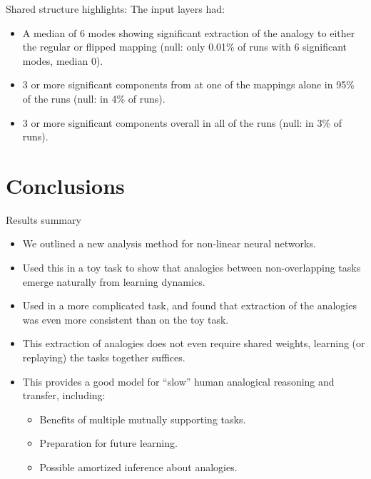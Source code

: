 \documentclass{beamer}
\begin{document}
\begin{frame}{Shared structure highlights:}
The input layers had:
\begin{itemize}
    \item<1-> A median of 6 modes showing significant extraction of the analogy to either the regular or flipped mapping (null: only 0.01\% of runs with 6 significant modes, median 0).
    \item<2-> 3 or more significant components from at one of the mappings alone in 95\% of the runs (null: in 4\% of runs).
    \item<3-> 3 or more significant components overall in all of the runs (null: in 3\% of runs).
\end{itemize}
\end{frame}
\section{Conclusions}

\begin{frame}{Results summary}
\begin{itemize}
    \item<1-> We outlined a new analysis method for non-linear neural networks. 
    \item<2-> Used this in a toy task to show that analogies between non-overlapping tasks emerge naturally from learning dynamics. 
    \item<3-> Used in a more complicated task, and found that extraction of the analogies was even more consistent than on the toy task. 
    \item<4-> This extraction of analogies does not even require shared weights, learning (or replaying) the tasks together suffices.
    \item<5-> This provides a good model for ``slow'' human analogical reasoning and transfer, including:
    \begin{itemize}
	\item<6-> Benefits of multiple mutually supporting tasks.
	\item<7-> Preparation for future learning.
	\item<8-> Possible amortized inference about analogies.
    \end{itemize}
\end{itemize}
\end{frame}
\end{document}
